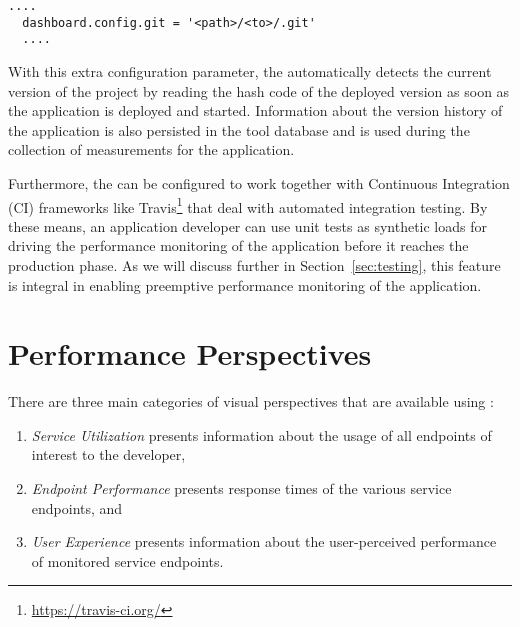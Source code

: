 \documentclass{sig-alternate-05-2015}
\begin{document}
  \begin{lstlisting}[style=custompython]
  ....
  dashboard.config.git = '<path>/<to>/.git'
  ....
  \end{lstlisting}  
  
  With this extra configuration parameter, the \tool automatically detects the current version of the project by reading the hash code of the deployed version as soon as the application is deployed and started. Information about the version history of the application is also persisted in the tool database and is used during the collection of measurements for the application.
  
  Furthermore, the \tool can be configured to work together with Continuous Integration (CI) frameworks like Travis\footnote{\url{https://travis-ci.org/}} that deal with automated integration testing. By these means, an application developer can use unit tests as synthetic loads for driving the performance monitoring of the application before it reaches the production phase.  As we will discuss further in Section~\ref{sec:testing}, this feature is integral in enabling preemptive performance monitoring of the application.  

\section{Performance Perspectives}
\label{sec:views}

  There are three main categories of visual perspectives that are available using \tool:
  \begin{enumerate}
    \item \textit{Service Utilization} presents information about the usage of all endpoints of interest to the developer,
    \item \textit{Endpoint Performance} presents response times of the various service endpoints, and
    \item \textit{User Experience} presents information about the user-perceived performance of monitored service endpoints.
  \end{enumerate}


\end{document}
